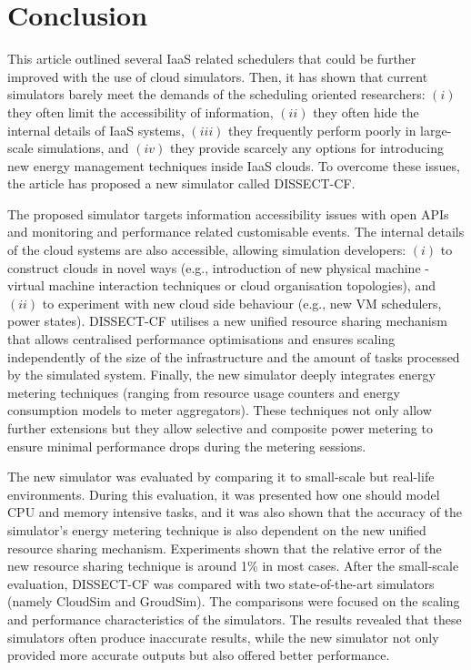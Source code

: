 \documentclass[sort, compress, 5p]{elsarticle}
\begin{document}
\section{Conclusion} \label{sec-conclusion}
This article outlined several IaaS related schedulers that could be further improved with the use of cloud simulators. Then, it has shown that current simulators barely meet the demands of the scheduling oriented researchers: $(i)$ they often limit the accessibility of information, $(ii)$ they often hide the internal details of IaaS systems, $(iii)$ they frequently perform poorly in large-scale simulations, and $(iv)$ they provide scarcely any options for introducing new energy management techniques inside IaaS clouds. To overcome these issues, the article has proposed a new simulator called DISSECT-CF.

The proposed simulator targets information accessibility issues with open APIs and monitoring and performance related customisable events. The internal details of the cloud systems are also accessible, allowing simulation developers: $(i)$ to construct clouds in novel ways (e.g., introduction of new physical machine - virtual machine interaction techniques or cloud organisation topologies), and $(ii)$ to experiment with new cloud side behaviour (e.g., new VM schedulers, power states). DISSECT-CF utilises a new unified resource sharing mechanism that allows centralised performance optimisations and ensures scaling independently of the size of the infrastructure and the amount of tasks processed by the simulated system. Finally, the new simulator deeply integrates energy metering techniques (ranging from resource usage counters and energy consumption models to meter aggregators). These techniques not only allow further extensions but they allow selective and composite power metering to ensure minimal performance drops during the metering sessions.

The new simulator was evaluated by comparing it to small-scale but real-life environments. During this evaluation, it was presented how one should model CPU and memory intensive tasks, and it was also shown that the accuracy of the simulator's energy metering technique is also dependent on the new unified resource sharing mechanism. Experiments shown that the relative error of the new resource sharing technique is around 1\% in most cases. After the small-scale evaluation, DISSECT-CF was  compared with two state-of-the-art simulators (namely CloudSim and GroudSim). The comparisons were  focused on the scaling and performance characteristics of the simulators. The results revealed that these simulators often produce inaccurate results, while the new simulator not only provided more accurate outputs but also offered better performance.
\end{document}
